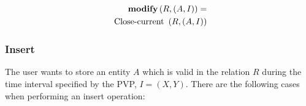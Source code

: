 \begin{align}
\label{eq:modify-fuzzy-temporal}
\mbox{\textbf{modify}} \left( R, \left( A, I \right) \right) =\\
\nonumber
\mbox{ Close-current }\left(R, \left(A, I\right) \right) 
\end{align}

\subsubsection{\label{subsubsec:insert-fuzzy-temporal}Insert}
The user wants to store an entity $A$ which is valid in the relation $R$ during the time interval specified by the PVP, $I = \left(X, Y \right)$.
%
%
There are the following cases when performing an insert operation:

